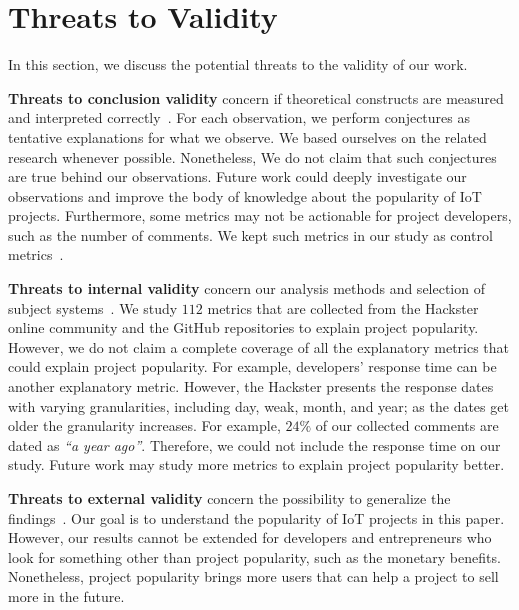 \section{Threats to Validity}\label{section:threats}

In this section, we discuss the potential threats to the validity of our work.


\textbf{Threats to conclusion validity} concern if theoretical constructs are measured and interpreted correctly~\cite{Shull:2007:GAE:1324786}.
For each observation, we perform conjectures as tentative explanations for what we observe. We based ourselves on the related research whenever possible.
Nonetheless, We do not claim that such conjectures are true behind our observations. Future work could deeply investigate our observations and improve the body of knowledge about the popularity of IoT projects.
Furthermore, some metrics may not be actionable for project developers, such as the number of comments. We kept such metrics in our study as control metrics~\cite{noru2012ibm}.


\textbf{Threats to internal validity} concern our analysis methods and selection of subject systems~\cite{Shull:2007:GAE:1324786}.
We study $112$ metrics that are collected from the Hackster online community and the GitHub repositories to explain project popularity. However, we do not claim a complete coverage of all the explanatory metrics that could explain project popularity.
For example, developers' response time can be another explanatory metric. However, the Hackster presents the response dates with varying granularities, including day, weak, month, and year; as the dates get older the granularity increases. For example, $24\%$ of our collected comments are dated as \textit{``a year ago''}. Therefore, we could not include the response time on our study.
Future work may study more metrics to explain project popularity better. 


\textbf{Threats to external validity} concern the possibility to generalize the
findings~\cite{Shull:2007:GAE:1324786}. Our goal is to understand the
popularity of IoT projects in this paper. However, our results cannot be extended for developers and entrepreneurs who look for something other than
project popularity, such as the monetary benefits. Nonetheless, project
popularity brings more users that can help a project to sell more in the
future.


